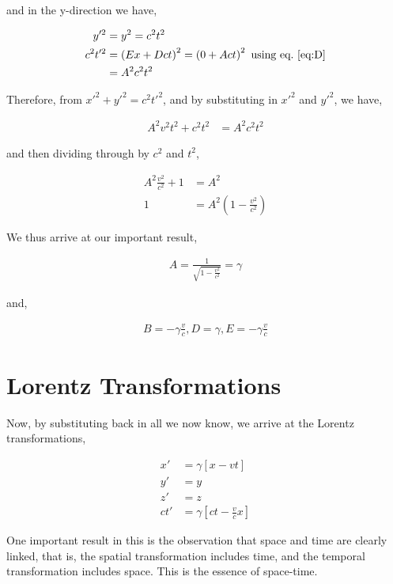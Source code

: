 \documentclass[11pt]{amsart}
\begin{document}
and in the y-direction we have,

\begin{align*}
y'^2 &= y^2 = c^2 t^2 \\
c^2 t'^2 &= \left(Ex + Dct\right)^2 = \left(0 + Act\right)^2 \text{  using eq.~\ref{eq:D}} \\
         &= A^2 c^2 t^2
\end{align*}

Therefore, from $x'^2 + y'^2 = c^2 t'^2$, and by substituting in $x'^2$ and $y'^2$, we have,

\begin{align*}
A^2 v^2 t^2 + c^2 t^2 &= A^2 c^2 t^2
\end{align*}

and then dividing through by $c^2$ and $t^2$,

\begin{align*}
A^2 \frac{v^2}{c^2} + 1 &= A^2 \\
1 &= A^2\left(1 - \frac{v^2}{c^2}\right)
\end{align*}

We thus arrive at our important result,

\begin{align}
\label{eq:gamma}
A = \frac{1}{\sqrt{1 - \frac{v^2}{c^2}}} = \gamma
\end{align}

and,

\begin{align*}
B = -\gamma \frac{v}{c}, D = \gamma, E = -\gamma \frac{v}{c}
\end{align*}

\section{Lorentz Transformations}

Now, by substituting back in all we now know, we arrive at the Lorentz transformations,

\begin{align*}
x' &= \gamma\left[x - vt\right] \\
y' &= y \\
z' &= z \\
ct' &= \gamma\left[ct - \frac{v}{c} x\right]
\end{align*}

One important result in this is the observation that space and time are clearly linked, that is, the spatial transformation includes time, and the temporal transformation includes space. This is the essence of space-time.
\end{document}
